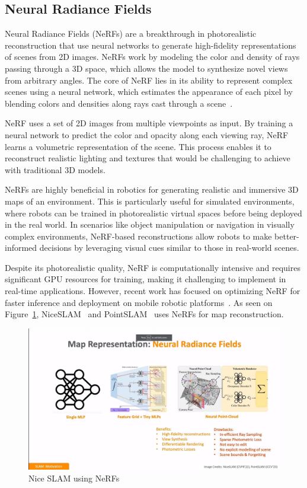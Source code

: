 \subsection{Neural Radiance Fields}

Neural Radiance Fields (NeRFs) are a breakthrough in photorealistic reconstruction that use neural networks to generate high-fidelity representations of scenes from 2D images. NeRFs work by modeling the color and density of rays passing through a 3D space, which allows the model to synthesize novel views from arbitrary angles. The core of NeRF lies in its ability to represent complex scenes using a neural network, which estimates the appearance of each pixel by blending colors and densities along rays cast through a scene~\cite{nerf}.

NeRF uses a set of 2D images from multiple viewpoints as input. By training a neural network to predict the color and opacity along each viewing ray, NeRF learns a volumetric representation of the scene. This process enables it to reconstruct realistic lighting and textures that would be challenging to achieve with traditional 3D models.

NeRFs are highly beneficial in robotics for generating realistic and immersive 3D maps of an environment. This is particularly useful for simulated environments, where robots can be trained in photorealistic virtual spaces before being deployed in the real world. In scenarios like object manipulation or navigation in visually complex environments, NeRF-based reconstructions allow robots to make better-informed decisions by leveraging visual cues similar to those in real-world scenes.

Despite its photorealistic quality, NeRF is computationally intensive and requires significant GPU resources for training, making it challenging to implement in real-time applications. However, recent work has focused on optimizing NeRF for faster inference and deployment on mobile robotic platforms~\cite{nerfhub}. As seen on Figure~\ref{fig:nice_slam}, NiceSLAM~\cite{nice_slam} and PointSLAM~\cite{pointslam} uses NeRFs for map reconstruction.

\FloatBarrier
\begin{figure}[htbp]
	\centering
	\includegraphics[width=150mm, keepaspectratio]{figures_jpg/nice_slam.jpg}
	\caption{Nice SLAM using NeRFs}
	\label{fig:nice_slam}
\end{figure}
\FloatBarrier


